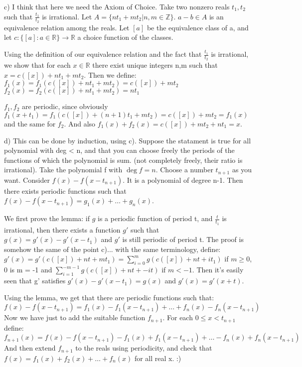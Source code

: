 \begin{solution}
	c) I think that here we need the Axiom of Choice.
Take two nonzero reals $t_{1},t_{2}$ such that $\frac{t_{1}}{t_{2}}$ is irrational. Let $A = \{nt_{1}+mt_{2}| n,m \in \mathbb{Z}\}$. $a-b \in A$ is an equivalence relation among the reals. Let $[a]$ be the equivalence class of a, and let $c: \{[a]: a \in \mathbb{R}\}\rightarrow \mathbb{R}$ a choice function of the classes.

Using the definition of our equivalence relation and the fact that $\frac{t_{1}}{t_{2}}$ is irrational, we show that for each $x \in \mathbb{R}$ there exist unique integers n,m such that $x = c([x])+nt_{1}+mt_{2}$. Then we define:
$f_{1}(x) = f_{1}(c([x])+nt_{1}+mt_{2}) = c([x])+mt_{2}$
$f_{2}(x) = f_{2}(c([x])+nt_{1}+mt_{2}) = nt_{1}$

$f_{1},f_{2}$ are periodic, since obviously $f_{1}(x+t_{1})= f_{1}(c([x])+(n+1)t_{1}+mt_{2})= c([x])+mt_{2}= f_{1}(x)$ and the same for $f_{2}$.
And also $f_{1}(x)+f_{2}(x) = c([x])+mt_{2}+nt_{1}= x$.

d) This can be done by induction, using c). Suppose the statament is true for all polynomial with deg < n, and that you can choose freely the periods of the functions of which the polynomial is sum. (not completely freely, their  ratio is irrational).
Take the polynomial f with $\deg f = n$. Choose a number $t_{n+1}$ as you want.
Consider $f(x)-f(x-t_{n+1})$. It is a polynomial of degree n-1. Then there exists periodic functions such that
$f(x)-f(x-t_{n+1})= g_{1}(x)+\ldots+g_{n}(x)$.

We first prove the lemma: if $g$ is a periodic function of period t, and $\frac{t}{t_{1}}$ is irrational, then there exists a function $g'$ such that $g(x) = g'(x)-g'(x-t_{1})$ and $g'$ is still periodic of period t.
The proof is somehow the same of the point c)... with the same terminology, define:
$g'(x) = g'(c([x])+nt+m t_{1}) = \sum_{i=0}^{m}g(c([x])+nt+it_{1})$ if $m \ge 0$, 0 is m = -1 and $\sum_{i=1}^{-m-1}g(c([x])+nt+-it)$ if $m<-1$.
Then it's easily seen that g' satisfies $g'(x)-g'(x-t_{1}) = g(x)$ and $g'(x) = g'(x+t)$.

Using the lemma, we get that there are periodic functions such that:
$f(x)-f(x-t_{n+1}) = f_{1}(x)-f_{1}(x-t_{n+1})+\ldots+f_{n}(x)-f_{n}(x-t_{n+1})$
Now we have just to add the suitable function $f_{n+1}$.
For each $0\le x < t_{n+1}$ define:
$f_{n+1}(x) = f(x)-f(x-t_{n+1})-f_{1}(x)+f_{1}(x-t_{n+1})+\ldots-f_{n}(x)+f_{n}(x-t_{n+1})$
And then extend $f_{n+1}$ to the reals using periodicity, and check that
$f(x) = f_{1}(x)+f_{2}(x)+\ldots+f_{n}(x)$ for all real x.  :)
\end{solution}



